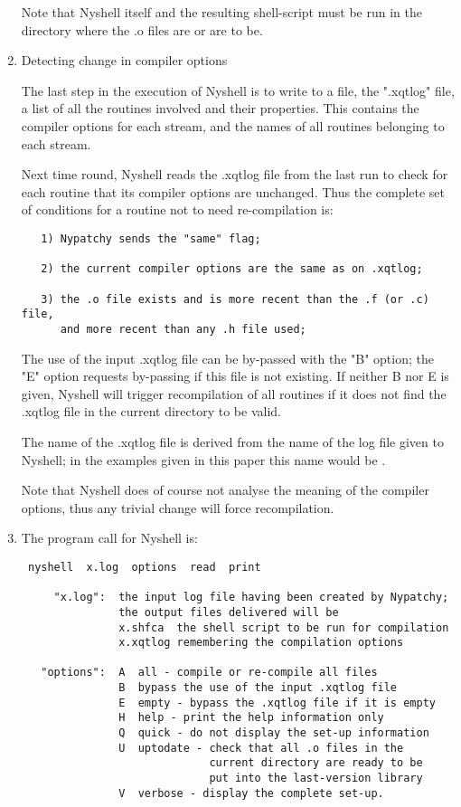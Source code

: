 \begin{enumerate}
Note that Nyshell itself and the resulting shell-script 
must be run in the directory where the .o files are or are to be.

\item
Detecting change in compiler options

The last step in the execution of Nyshell is to write to a file,
the ".xqtlog" file, a list of all the routines involved and their
properties. This contains the compiler options for each stream,
and the names of all routines belonging to each stream.

Next time round, Nyshell reads the .xqtlog file from the last run
to check for each routine that its compiler options are unchanged.
Thus the complete set of conditions for a routine not to need
re-compilation is:
\begin{verbatim}
   1) Nypatchy sends the "same" flag;

   2) the current compiler options are the same as on .xqtlog;

   3) the .o file exists and is more recent than the .f (or .c) file,
      and more recent than any .h file used;
\end{verbatim}
The use of the input .xqtlog file can be by-passed with the "B" option;
the "E" option requests by-passing if this file is not existing.
If neither B nor E is given, Nyshell will trigger recompilation of all
routines if it does not find the .xqtlog file in the current directory
to be valid.

The name of the .xqtlog file is derived from the name of the log
file given to Nyshell; in the examples given in this paper this
name would be .

Note that Nyshell does of course not analyse the meaning of the
compiler options, thus any trivial change will force recompilation.

\item
The program call for Nyshell is:
\begin{verbatim}
 nyshell  x.log  options  read  print

     "x.log":  the input log file having been created by Nypatchy;
               the output files delivered will be
               x.shfca  the shell script to be run for compilation
               x.xqtlog remembering the compilation options

   "options":  A  all - compile or re-compile all files
               B  bypass the use of the input .xqtlog file
               E  empty - bypass the .xqtlog file if it is empty
               H  help - print the help information only
               Q  quick - do not display the set-up information
               U  uptodate - check that all .o files in the
                             current directory are ready to be
                             put into the last-version library
               V  verbose - display the complete set-up.


\end{verbatim}
\end{enumerate}
